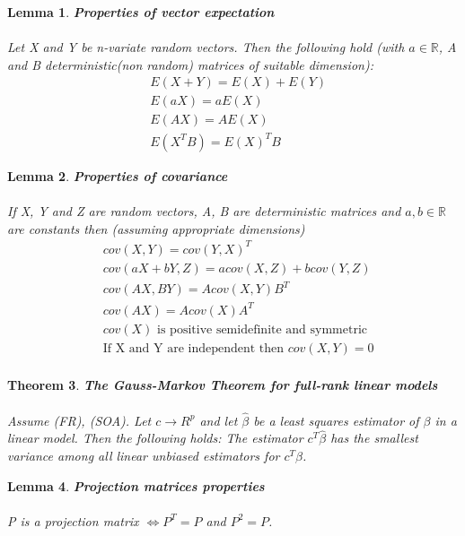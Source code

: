\documentclass{article}
\newtheorem{lemma}{Lemma}
\newtheorem{theorem}[lemma]{Theorem}
\begin{document}
\begin{lemma} \textbf{Properties of vector expectation} \\
\\
 Let X and Y be n-variate random vectors. Then the following hold (with $a \in \mathbb{R}$, A and B deterministic(non random) matrices of suitable dimension):
 \begin{align*}
     &E(X+Y) = E(X)+E(Y) \\
     &E(aX)=aE(X) \\
     &E(AX) = A E(X) \\
     &E(X^T B ) = E(X)^T B 
 \end{align*}
\end{lemma}

\begin{lemma} \textbf{Properties of covariance}\\
\\
 If X, Y and Z are random vectors, A, B are deterministic matrices and $a, b \in \mathbb{R}$ are constants then (assuming appropriate dimensions)
 \begin{align*}
     &cov(X, Y) = cov(Y, X)^T \\
&cov(aX + bY, Z) = a cov(X, Z) + b cov(Y, Z) \\
&cov(AX, BY) = A cov(X, Y)B^T \\
&cov(AX) = A cov(X)A^T \\
&cov(X) \text{ is positive semidefinite and symmetric }\\
&\text{If X and Y are independent then } cov(X, Y) = 0 \\
 \end{align*}
\end{lemma}
\begin{theorem}
 \textbf{The Gauss-Markov Theorem for full-rank linear models} \\
 \\ Assume (FR), (SOA). Let $c \to R^p$ and let $\hat{\beta}$ be a least squares estimator of $\beta$ in a linear model. Then the following holds: The estimator $c^T \hat{\beta}$ has the smallest variance among all linear unbiased estimators for $c^T\beta$.

\end{theorem}
\begin{lemma} \textbf{Projection matrices properties} \\
\\
P is a projection matrix $\iff P^T =P$ and $P^2=P $.
\end{lemma}
\end{document}
